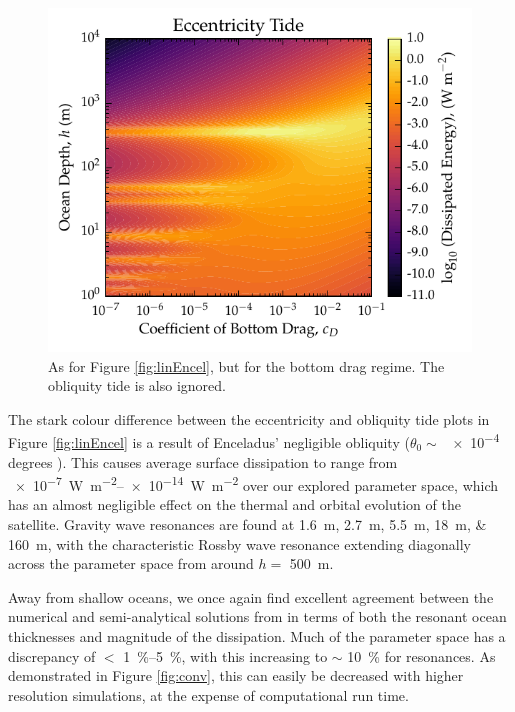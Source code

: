 \begin{figure}[!t]
    \centering
    \includegraphics[width=\linewidth]{Figures/enceladus_bottom}
\caption{As for Figure \ref{fig:linEncel}, but for the bottom drag regime. The obliquity tide is also ignored. \label{fig:botEncel}}
\end{figure}

The stark colour difference between the eccentricity and obliquity tide plots in Figure \ref{fig:linEncel} is a result of Enceladus' negligible obliquity ($\theta_0 \sim$ \num{e-4} degrees \citep{chen2013tidal, baland2016obliquity}). This causes average surface dissipation to range from \SIrange{e-7}{e-14}{\watt\per\square\metre} over our explored parameter space, which has an almost negligible effect on the thermal and orbital evolution of the satellite. Gravity wave resonances are found at \SIlist{1.6;2.7;5.5;18;160}{\metre}, with the characteristic Rossby wave resonance extending diagonally across the parameter space from around $h=$ \SI{500}{\metre}.

Away from shallow oceans, we once again find excellent agreement between the numerical and semi-analytical solutions from \citet{matsuyama2014tidal} in terms of both the resonant ocean thicknesses and magnitude of the dissipation. Much of the parameter space has a discrepancy of $<$ \SIrange{1}{5}{\percent}, with this increasing to $\sim$ \SI{10}{\percent} for resonances. As demonstrated in Figure \ref{fig:conv}, this can easily be decreased with higher resolution simulations, at the expense of computational run time.


